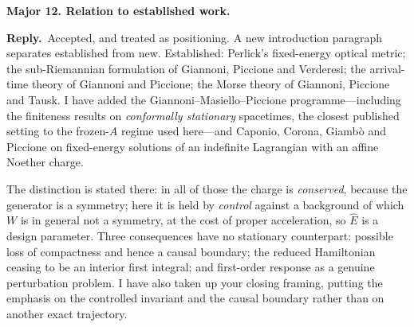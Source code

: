 \documentclass[11pt]{article}
\newcommand{\reply}{\par\noindent\textbf{Reply.}\ }
\newcommand{\R}[1]{\par\medskip\noindent\textbf{#1}\par\nopagebreak}
\begin{document}
\R{Major 12. Relation to established work.}
\reply Accepted, and treated as positioning. A new introduction paragraph separates
established from new. Established: Perlick's fixed-energy optical metric; the
sub-Riemannian formulation of Giannoni, Piccione and Verderesi; the arrival-time
theory of Giannoni and Piccione; the Morse theory of Giannoni, Piccione and Tausk. I
have added the Giannoni--Masiello--Piccione programme---including the finiteness
results on \emph{conformally stationary} spacetimes, the closest published setting to
the frozen-$A$ regime used here---and Caponio, Corona, Giamb\`o and Piccione on
fixed-energy solutions of an indefinite Lagrangian with an affine Noether charge.

The distinction is stated there: in all of those the charge is \emph{conserved},
because the generator is a symmetry; here it is held by \emph{control} against a
background of which $W$ is in general not a symmetry, at the cost of proper
acceleration, so $\hat E$ is a design parameter. Three consequences have no
stationary counterpart: possible loss of compactness and hence a causal boundary;
the reduced Hamiltonian ceasing to be an interior first integral; and first-order
response as a genuine perturbation problem. I have also taken up your closing
framing, putting the emphasis on the controlled invariant and the causal boundary
rather than on another exact trajectory.
\end{document}
